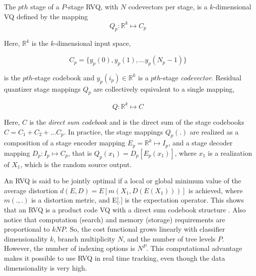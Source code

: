 \documentclass{article}
\begin{document}
The $pth$ stage of a $P$-stage RVQ, with $N$ codevectors per stage, is a $k$-dimensional VQ defined by the mapping 
\begin{equation}
Q_p : \mathbb{R}^k \mapsto C_p
\end{equation}
  
Here, $\mathbb{R}^k$ is the $k$-dimensional input space,   

\begin{equation}
C_p = \{y_p(0), y_p(1), \ldots y_p(N_p - 1) \}
\end{equation}

is the $pth$-stage codebook and $y_p(i_p) \in \mathbb{R}^k$ is a $pth$-stage \emph{codevector}.  
Residual quantizer stage mappings $Q_p$ are collectively equivalent to a single mapping,

\begin{equation}
Q : \mathbb{R}^k \mapsto C
\end{equation}



Here, $C$ is the \emph{direct sum codebook} and is the direct sum of the stage codebooks $C=C_1 + C_2 + \ldots C_p$.  
In practice, the stage mappings $Q_p(.)$ are realized as a composition of a stage encoder mapping $E_p = \mathbb{R}^k \mapsto I_p$, and a stage decoder mapping $D_p: I_p \mapsto C_p$, that is $Q_p(x_1) = D_p[E_p(x_1)]$, where $x_1$ is a realization of $X_1$, which is the random source output.  


An RVQ is said to be jointly optimal if a local or global minimum value of the average distortion $d(E,D) = E[m(X_1, D(E(X_1)))]$ is achieved, where $m(.,.)$ is a distortion metric, and E[.] is the expectation operator.  This shows that an RVQ is a product code VQ with a direct sum codebook structure \cite{1993_JNL_RVQDSC_Barnes}.  Also notice that computation (search) and memory (storage) requirements are proportional to $kNP$.  So, the cost functional grows linearly with classifier dimensionality $k$, branch multiplicity $N$, and the number of tree levels $P$.  However, the number of indexing options is $N^P$.  This computational advantage makes it possible to use RVQ in real time tracking, even though the data dimensionality is very high.
\end{document}
